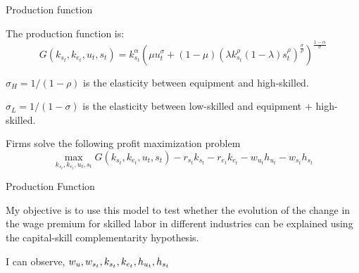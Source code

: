 \documentclass[notes,11pt, aspectratio=169]{beamer}
\newenvironment{wideitemize}{\itemize\addtolength{\itemsep}{10pt}}{\enditemize}
\begin{document}
\begin{frame}{Production function}
    \begin{wideitemize}
    \item The production function is:
      \begin{equation}\label{eq:production_fun}
        G(k_{s_t}, k_{e_t}, u_t, s_t) = k_{s_t}^\alpha\left( \mu u_t^\sigma + (1-\mu)\left(\lambda k_{s_t}^\rho (1-\lambda)s_t^\rho\right)^\frac{\sigma}{\rho}\right)^\frac{1-\alpha}{\sigma}
      \end{equation}
    \item $\sigma_{H} = 1/(1-\rho)$ is the elasticity between equipment and high-skilled.
    \item $\sigma_{L} = 1/(1-\sigma)$ is the elasticity between low-skilled and equipment + high-skilled.
    \item Firms solve the following profit maximization problem 
    \begin{equation}\label{eq:profit_max}
      \max_{k_{s_t}, k_{e_t}, u_t, s_t} G(k_{s_t}, k_{e_t}, u_t, s_t) - r_{s_t}k_{s_t} - r_{e_t}k_{e_t} - w_{u_t} h_{u_t} - w_{s_t} h_{s_t}
    \end{equation}
  \end{wideitemize}
\end{frame}

\begin{frame}{Production Function}
    \begin{wideitemize}
        \item My objective is to use this model to test whether the evolution of the change in the wage premium for skilled labor in different industries can be explained using the capital-skill complementarity hypothesis.
        
        \item I can observe, $\textcolor{black}{w_{u}}, \textcolor{black}{w_{s_t}}, k_{s_t}, \textcolor{black}{k_{e_t}}, \textcolor{black}{h_{u_t}}, \textcolor{black}{h_{s_t}}$
        
    \end{wideitemize}
\end{frame}
\end{document}
